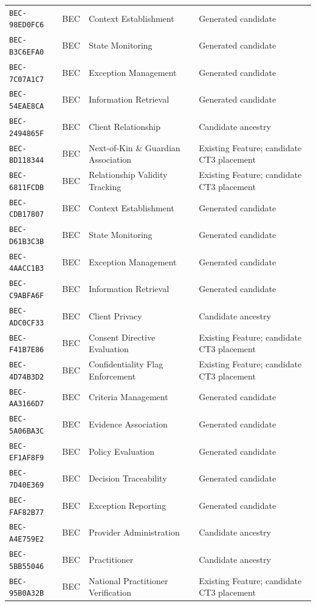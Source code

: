 \documentclass[11pt,a4paper,openany]{book}
\begin{document}
\begin{longtable}{@{}p{.19\linewidth}p{.12\linewidth}p{.39\linewidth}p{.24\linewidth}@{}}
\texttt{BEC-98ED0FC6} & BEC & Context Establishment & Generated candidate \\
\texttt{BEC-B3C6EFA0} & BEC & State Monitoring & Generated candidate \\
\texttt{BEC-7C07A1C7} & BEC & Exception Management & Generated candidate \\
\texttt{BEC-54EAE8CA} & BEC & Information Retrieval & Generated candidate \\
\texttt{BEC-2494865F} & BEC & Client Relationship & Candidate ancestry \\
\texttt{BEC-BD118344} & BEC & Next-of-Kin \& Guardian Association & Existing Feature; candidate CT3 placement \\
\texttt{BEC-6811FCDB} & BEC & Relationship Validity Tracking & Existing Feature; candidate CT3 placement \\
\texttt{BEC-CDB17807} & BEC & Context Establishment & Generated candidate \\
\texttt{BEC-D61B3C3B} & BEC & State Monitoring & Generated candidate \\
\texttt{BEC-4AACC1B3} & BEC & Exception Management & Generated candidate \\
\texttt{BEC-C9ABFA6F} & BEC & Information Retrieval & Generated candidate \\
\texttt{BEC-ADC0CF33} & BEC & Client Privacy & Candidate ancestry \\
\texttt{BEC-F41B7E86} & BEC & Consent Directive Evaluation & Existing Feature; candidate CT3 placement \\
\texttt{BEC-4D74B3D2} & BEC & Confidentiality Flag Enforcement & Existing Feature; candidate CT3 placement \\
\texttt{BEC-AA3166D7} & BEC & Criteria Management & Generated candidate \\
\texttt{BEC-5A06BA3C} & BEC & Evidence Association & Generated candidate \\
\texttt{BEC-EF1AF8F9} & BEC & Policy Evaluation & Generated candidate \\
\texttt{BEC-7D40E369} & BEC & Decision Traceability & Generated candidate \\
\texttt{BEC-FAF82B77} & BEC & Exception Reporting & Generated candidate \\
\texttt{BEC-A4E759E2} & BEC & Provider Administration & Candidate ancestry \\
\texttt{BEC-5BB55046} & BEC & Practitioner & Candidate ancestry \\
\texttt{BEC-95B0A32B} & BEC & National Practitioner Verification & Existing Feature; candidate CT3 placement \\

\end{longtable}
\end{document}
